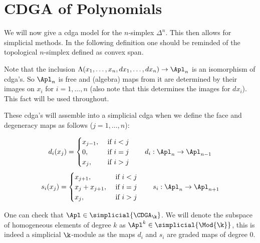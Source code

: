 
\section{CDGA of Polynomials}
\label{sec:cdga-of-polynomials}

We will now give a cdga model for the $n$-simplex $\Delta^n$. This then allows for simplicial methods. In the following definition one should be reminded of the topological $n$-simplex defined as convex span.


Note that the inclusion $\Lambda(x_1, \ldots, x_n, dx_1, \ldots, dx_n) \to \Apl_n$ is an isomorphism of cdga's. So $\Apl_n$ is free and (algebra) maps from it are determined by their images on $x_i$ for $i = 1, \ldots, n$ (also note that this determines the images for $dx_i$). This fact will be used throughout.

These cdga's will assemble into a simplicial cdga when we define the face and degeneracy maps as follows ($j = 1, \ldots, n$):

$$ d_i(x_j) = \begin{cases}
	x_{j-1}, &\text{ if } i < j \\
	0,       &\text{ if } i = j \\
	x_j,     &\text{ if } i > j
\end{cases} \qquad d_i : \Apl_n \to \Apl_{n-1} $$
$$ s_i(x_j) = \begin{cases}
	x_{j+1},       &\text{ if } i < j \\
	x_j + x_{j+1}, &\text{ if } i = j \\
	x_j,           &\text{ if } i > j	
\end{cases} \qquad s_i : \Apl_n \to \Apl_{n+1} $$

One can check that $\Apl \in \simplicial{\CDGA_\k}$. We will denote the subspace of homogeneous elements of degree $k$ as $\Apl^k \in \simplicial{\Mod{\k}}$, this is indeed a simplicial $\k$-module as the maps $d_i$ and $s_i$ are graded maps of degree $0$.

